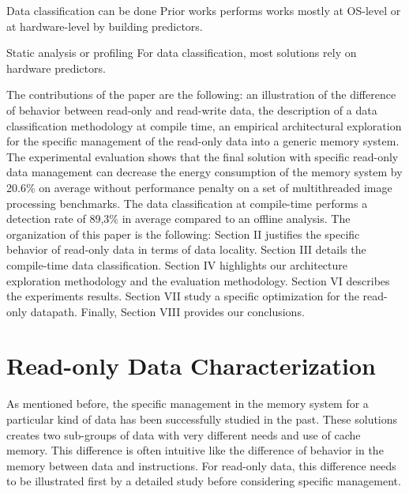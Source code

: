 \documentclass[sigconf]{acmart}
\begin{document}
Data classification can be done 
Prior works performs works mostly at OS-level or at hardware-level by building predictors. 

Static analysis or profiling      
For data classification, most solutions rely on hardware predictors. 



The contributions of the paper are the following: an illustration of the difference of behavior between read-only and read-write data, the description of a data classification methodology at compile time, an empirical architectural exploration for the specific management of the read-only data into a generic memory system. 
The experimental evaluation shows that the final solution with specific read-only data management can decrease the energy consumption of the memory system by 20.6\% on average without performance penalty on a set of multithreaded image processing benchmarks. The data classification at compile-time performs a detection rate of 89,3\% in average compared to an offline analysis. The organization of this paper is the following: Section II justifies the specific behavior of read-only data in terms of data locality. Section III details the compile-time data classification. Section IV highlights our architecture exploration methodology and the evaluation methodology. Section VI describes the experiments results. Section VII study a specific optimization for the read-only datapath. Finally, Section VIII provides our conclusions.


\section{Read-only Data Characterization}

As mentioned before, the specific management in the memory system for a particular kind of data has been successfully studied in the past. These solutions creates two sub-groups of data with very different needs and use of cache memory. This difference is often intuitive like the difference of behavior in the memory between data and instructions. For read-only data, this difference needs to be illustrated first by a detailed study before considering specific management.  
\end{document}
